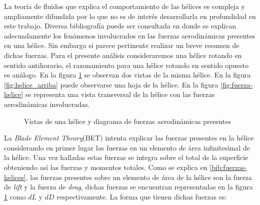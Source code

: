 \documentclass[main]{subfiles}
\begin{document}
La teor\'ia de fluidos que explica el comportamiento de las h\'elices es compleja y ampliamente difundida por lo que no es de inter\'es desarrollarla en profundidad en este trabajo. Diversa bibliograf\'ia puede ser consultada en donde se explican adecuadamente los fen\'omenos involucrados en las fuerzas aerodin\'amicas presentes en una h\'elice. Sin embargo si parece pertinente realizar un breve resumen de dichas fuerzas. Para el presente an\'alisis consideraremos una h\'elice rotando en sentido antihorario, el razonamiento para una h\'elice rotando en sentido opuesto es an\'alogo. En la figura \ref{fig:helice} se observan dos vistas de la misma h\'elice. En la figura \ref{fig:helice_arriba} puede observarse una hoja de la h\'elice. En la figura \ref{fig:fuerza-helice} se representa una vista transversal de la h\'elice con las fuerzas aerodin\'amicas involucradas.\\ 

\begin{figure} [h!]
  \centering
  \caption{Vistas de una h\'elice y diagrama de fuerzas aerodin\'amicas presentes}
  \label{fig:helice}
\end{figure}

La \emph{Blade Element Theory}(BET) intenta explicar las fuerzas presentes en la h\'elice considerando en primer lugar las fuerzas en un elemento de \'area infinitesimal de la h\'elice. Una vez halladas estas fuerzas se integra sobre el total de la superficie obteniendo as\'i las fuerzas y momentos totales. Como se explica en \ref{bib:fuerzas-helices}, las fuerzas presentes sobre un elemento de \'area de la h\'elice son la fuerza de \emph{lift} y la fuerza de \emph{drag}, dichas fuerzas se encuentran representadas en la figura \ref{fig:helice} como $dL$ y $dD$ respectivamente. La forma que tienen dichas fuerzas es:
\end{document}
